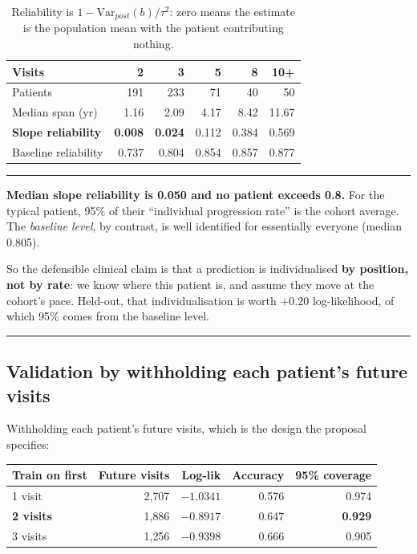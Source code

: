 \documentclass[11pt,a4paper]{article}
\newenvironment{keypoint}
  {\begin{center}\begin{minipage}{0.94\textwidth}%
   \vspace{4pt}\hrule\vspace{7pt}\small}
  {\vspace{7pt}\hrule\vspace{4pt}\end{minipage}\end{center}}
\begin{document}
\begin{table}[H]
\centering
\begin{tabular}{@{}lrrrrr@{}}
\toprule
\textbf{Visits} & 2 & 3 & 5 & 8 & 10+ \\
\midrule
Patients                & 191 & 233 & 71 & 40 & 50 \\
Median span (yr)        & 1.16 & 2.09 & 4.17 & 8.42 & 11.67 \\
\textbf{Slope reliability}     & \textbf{0.008} & \textbf{0.024} & 0.112 & 0.384 & 0.569 \\
Baseline reliability    & 0.737 & 0.804 & 0.854 & 0.857 & 0.877 \\
\bottomrule
\end{tabular}
\caption{Reliability is $1 - \mathrm{Var}_{post}(b)/\tau^2$: zero means the
estimate is the population mean with the patient contributing nothing.}
\end{table}

\begin{keypoint}
\textbf{Median slope reliability is 0.050 and no patient exceeds 0.8.} For the
typical patient, 95\% of their ``individual progression rate'' is the cohort
average. The \emph{baseline level}, by contrast, is well identified for
essentially everyone (median 0.805).

So the defensible clinical claim is that a prediction is individualised
\textbf{by position, not by rate}: we know where this patient is, and assume they
move at the cohort's pace. Held-out, that individualisation is worth $+0.20$
log-likelihood, of which 95\% comes from the baseline level.
\end{keypoint}

\subsection{Validation by withholding each patient's future visits}

Withholding each patient's future visits, which is the design the proposal
specifies:

\begin{table}[H]
\centering
\begin{tabular}{@{}lrrrr@{}}
\toprule
\textbf{Train on first} & \textbf{Future visits} & \textbf{Log-lik} & \textbf{Accuracy} & \textbf{95\% coverage} \\
\midrule
1 visit  & 2{,}707 & $-1.0341$ & 0.576 & 0.974 \\
\textbf{2 visits} & 1{,}886 & $\mathbf{-0.8917}$ & 0.647 & \textbf{0.929} \\
3 visits & 1{,}256 & $-0.9398$ & 0.666 & 0.905 \\
\bottomrule
\end{tabular}
\end{table}
\end{document}
